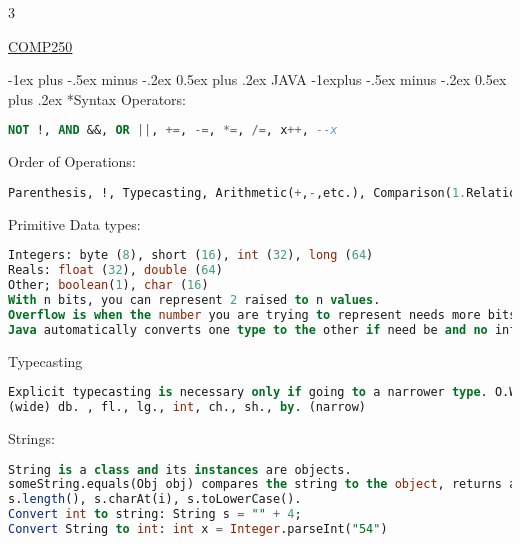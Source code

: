 \documentclass[10pt,landscape]{article}
\makeatletter
\renewcommand{\section}{\@startsection{section}{1}{0mm}%
                                {-1ex plus -.5ex minus -.2ex}%
                                {0.5ex plus .2ex}%
                                {\normalfont\large\bfseries}}
\renewcommand{\subsection}{\@startsection{subsection}{2}{0mm}%
                                {-1explus -.5ex minus -.2ex}%
                                {0.5ex plus .2ex}%
                                {\normalfont\normalsize\bfseries}}
\makeatother
\begin{document}
\raggedright
\footnotesize
\begin{multicols}{3}


\setlength{\premulticols}{1pt}
\setlength{\postmulticols}{1pt}
\setlength{\multicolsep}{1pt}
\setlength{\columnsep}{2pt}

\begin{center}
     \Large{\underline{COMP250}} \\
\end{center}

\section{JAVA}
\subsection*{Syntax}
Operators:
\begin{lstlisting}[language=SQL]
NOT !, AND &&, OR ||, +=, -=, *=, /=, x++, --x
\end{lstlisting}
Order of Operations:
\begin{lstlisting}[language=SQL]
Parenthesis, !, Typecasting, Arithmetic(+,-,etc.), Comparison(1.Relational: <,>,<=,>= 2.Equality: ==, !=), Boolean (&&, ||).
\end{lstlisting}
Primitive Data types:
\begin{lstlisting}[language=SQL]
Integers: byte (8), short (16), int (32), long (64)
Reals: float (32), double (64)
Other; boolean(1), char (16)
With n bits, you can represent 2 raised to n values. 
Overflow is when the number you are trying to represent needs more bits than its data type has. 
Java automatically converts one type to the other if need be and no info is lost.
\end{lstlisting}
Typecasting
\begin{lstlisting}[language=SQL]
Explicit typecasting is necessary only if going to a narrower type. O.W. done automatically.
(wide) db. , fl., lg., int, ch., sh., by. (narrow)
\end{lstlisting}
Strings:
\begin{lstlisting}[language=SQL]
String is a class and its instances are objects. 
someString.equals(Obj obj) compares the string to the object, returns a boolean. 
s.length(), s.charAt(i), s.toLowerCase(). 
Convert int to string: String s = "" + 4;
Convert String to int: int x = Integer.parseInt("54")
\end{lstlisting}

\end{multicols}
\end{document}

